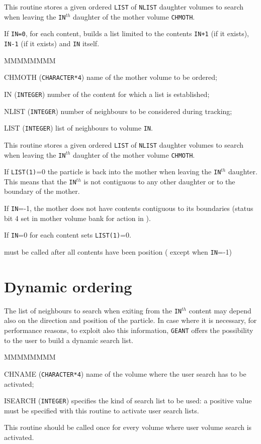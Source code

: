 This routine stores a given ordered {\tt LIST} of {\tt NLIST} daughter
volumes to search when leaving the {\tt IN}$^{th}$ daughter
of the mother volume {\tt CHMOTH}.

If {\tt IN=0}, for each content,  builds a list limited to
the contents {\tt IN+1} (if it exists), {\tt IN-1} (if it exists) and 
{\tt IN} itself.

\begin{DLtt}{MMMMMMMM}
\item[CHMOTH] ({\tt CHARACTER*4}) name of the mother volume to be ordered;
\item[IN]     ({\tt INTEGER}) number of the content for which a list
is established;
\item[NLIST]  ({\tt INTEGER}) number of neighbours to be considered 
during tracking;
\item[LIST]  ({\tt INTEGER}) list of neighbours to volume {\tt IN}.
\end{DLtt}

This routine stores a given ordered {\tt LIST} of {\tt NLIST} daughter
volumes to search when leaving the {\tt IN}$^{th}$ daughter
of the mother volume {\tt CHMOTH}.
 
If {\tt LIST(1)}=0 the particle is back into the mother when leaving the
{\tt IN}$^{th}$ daughter. This means that the {\tt IN}$^{th}$ is not 
contiguous to any other daughter or to the boundary of the mother.

If {\tt IN}=-1, the mother does not have contents contiguous
to its boundaries (status bit 4 set in mother volume bank for action in
).

If {\tt IN}=0 for each content  sets {\tt LIST(1)}=0.

 must be called after all contents have been position ( except
when {\tt IN}=-1)

\section*{Dynamic ordering}

The list of neighbours to search when exiting from the {\tt IN}$^{th}$
content may depend also on the direction and position of the particle.
In case where it is necessary, for performance reasons, to exploit also
this information, {\tt GEANT} offers the possibility to the user to 
build a dynamic search list.

\begin{DLtt}{MMMMMMMM}
\item[CHNAME] ({\tt CHARACTER*4}) name of the volume where the user search
has to be activated;
\item[ISEARCH] ({\tt INTEGER}) specifies the kind of search list to
be used: a positive value must be specified with this routine to activate
user search lists.
\end{DLtt}
This routine should be called once for every volume where user volume
search is activated.

